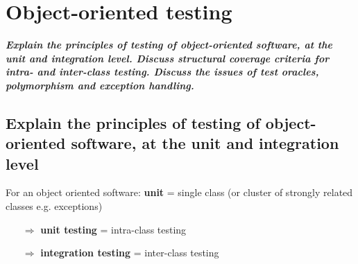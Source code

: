 \documentclass{article}
\begin{document}
\newpage
\section{Object-oriented testing}
\textbf{\textit{Explain the principles of testing of object-oriented software, at the unit and integration level. Discuss structural coverage criteria for intra- and inter-class testing. Discuss the issues of test oracles, polymorphism and exception handling.}}

\subsection{Explain the principles of testing of object-oriented software, at the unit and integration level}
\noindent For an object oriented software: \textbf{unit} = single class (or cluster of strongly related classes e.g. exceptions)
\begin{itemize}
    \item [$\Rightarrow$]\textbf{unit testing} = intra-class testing
    \item [$\Rightarrow$]\textbf{integration testing} = inter-class testing
\end{itemize}
\end{document}
